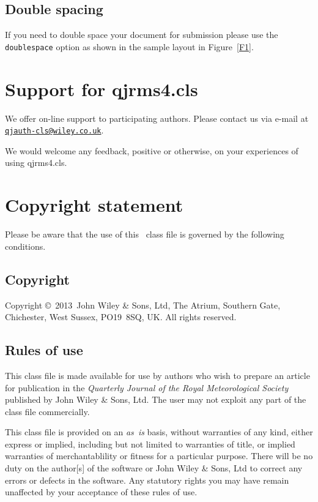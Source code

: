 \documentclass[times]{qjrms4}
\def\volumeyear{2013}
\begin{document}
\subsection{Double spacing}
If you need to double space your document for submission please
use the \verb+doublespace+ option as shown in the sample layout in
Figure~\ref{F1}.

\section{Support for \textsf{qjrms4.cls}}
We offer on-line support to participating authors.
Please contact us via e-mail at
\href{mailto:qjauth-cls@wiley.co.uk}{\texttt{qjauth-cls@wiley.co.uk}}.

We would welcome any feedback, positive or otherwise, on your
experiences of using \textsf{qjrms4.cls}.

\section{Copyright statement}
Please  be  aware that the use of  this \LaTeXe\ class file is
governed by the following conditions.

\subsection{Copyright}
Copyright \copyright\ \volumeyear\ John Wiley \& Sons, Ltd, The Atrium,
Southern Gate, Chichester, West Sussex, PO19~8SQ, UK.  All rights reserved.

\subsection{Rules of use}
This class file is made available for use by authors who wish to
prepare an article for publication in the \emph{Quarterly Journal
of the Royal Meteorological Society} published by John Wiley \&
Sons, Ltd.  The user may not exploit any part of the class file
commercially.

This class file is provided on an \emph{as~is}  basis, without
warranties of any kind, either express or implied, including but
not limited to warranties of title, or implied  warranties of
merchantablility or fitness for a particular purpose. There will
be no duty on the author[s] of the software or  John Wiley \&
Sons, Ltd to correct any errors or defects in the software. Any
statutory  rights you may have remain unaffected by your
acceptance of these rules of use.
\end{document}
